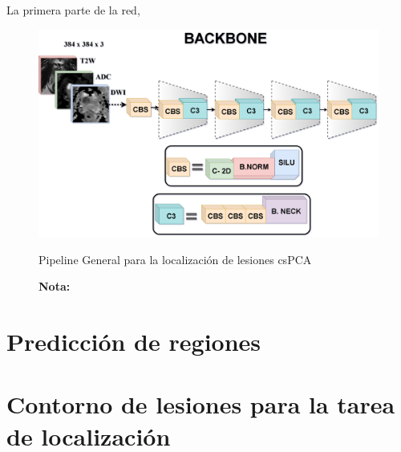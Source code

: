 
La primera parte de la red,

\begin{figure}[h!]
	\centering
	\caption{Pipeline General para la localización de lesiones csPCA}
	\includegraphics[width=1\textwidth]{imgs/backbone_1.png}
	\label{fig:backbone}
\end{figure}

\begin{figure}[h!]
	\noindent \textbf{Nota:} 
\end{figure}

\par

\newpage
\section{Predicción de regiones}





\par

\newpage
\section{Contorno de lesiones para la tarea de localización}

